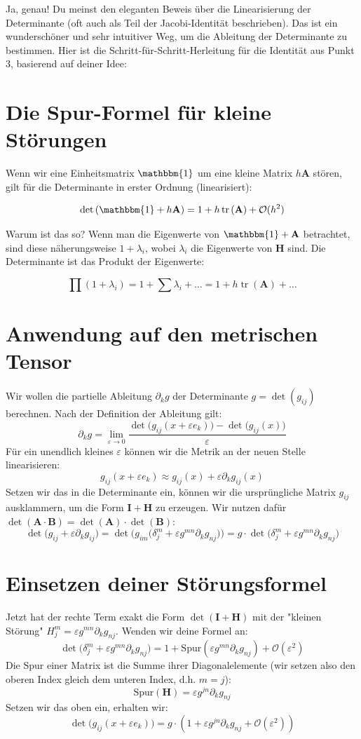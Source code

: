 \documentclass{article}
\newcommand{\p}[1]{\left(#1\right)}
\newcommand{\tr}{\operatorname{tr}}
\begin{document}
Ja, genau! Du meinst den eleganten Beweis über die Linearisierung der Determinante (oft auch als Teil der Jacobi-Identität beschrieben). Das ist ein wunderschöner und sehr intuitiver Weg, um die Ableitung der Determinante zu bestimmen.
Hier ist die Schritt-für-Schritt-Herleitung für die Identität aus Punkt 3, basierend auf deiner Idee:

 \section{Die Spur-Formel für kleine Störungen}
Wenn wir eine Einheitsmatrix $\mathbbm{1}$ um eine kleine Matrix $ h \mathbf{A}$ stören, gilt für die Determinante in erster Ordnung (linearisiert):


$$\det \p{\mathbbm{1} + h \mathbf{A}} = 1 + h \tr\p{\mathbf{A}} + \mathcal{O}(h^2)$$ 

Warum ist das so? Wenn man die Eigenwerte von $\mathbbm{1} + \mathbf{A}$ betrachtet, sind diese näherungsweise $1 + λ_i$, wobei $λ_i$ die Eigenwerte von $\mathbf{H}$ sind. Die Determinante ist das Produkt der Eigenwerte:

$$\prod (1 + λ_i) = 1 + \sum λ_i + \dots = 1 + h \tr \p{\mathbf{A}} + \dots$$

\section{Anwendung auf den metrischen Tensor}
Wir wollen die partielle Ableitung $\partial_k g$ der Determinante $g = \det(g_{ij})$ berechnen. Nach der Definition der Ableitung gilt:
$$\partial_k g = \lim_{ε \to 0} \frac{\det\big(g_{ij}(x + ε e_k)\big) - \det\big(g_{ij}(x)\big)}{ε}$$ 
Für ein unendlich kleines $ε$ können wir die Metrik an der neuen Stelle linearisieren:
$$g_{ij}(x + ε e_k) \approx g_{ij}(x) + ε \partial_k g_{ij}(x)$$ 
Setzen wir das in die Determinante ein, können wir die ursprüngliche Matrix $g_{ij}$ ausklammern, um die Form $\mathbf{I} + \mathbf{H}$ zu erzeugen. Wir nutzen dafür $\det(\mathbf{A}·\mathbf{B}) = \det(\mathbf{A})·\det(\mathbf{B})$:
$$\det\big(g_{ij} + ε \partial_k g_{ij}\big) = \det\Big( g_{im} \big( \delta^m_j + ε g^{mn} \partial_k g_{nj} \big) \Big) = g · \det\big(\delta^m_j + ε g^{mn} \partial_k g_{nj}\big)$$ 

\section{Einsetzen deiner Störungsformel}
Jetzt hat der rechte Term exakt die Form $\det\p{\mathbf{I} + \mathbf{H}}$ mit der "kleinen Störung" $H^m_j = ε g^{mn} \partial_k g_{nj}$.
Wenden wir deine Formel an:
$$\det\big(\delta^m_j + ε g^{mn} \partial_k g_{nj}\big) = 1 + \text{Spur}(ε g^{mn} \partial_k g_{nj}) + \mathcal{O}(ε^2)$$ 
Die Spur einer Matrix ist die Summe ihrer Diagonalelemente (wir setzen also den oberen Index gleich dem unteren Index, d.h. $m = j$):
$$\text{Spur}(\mathbf{H}) = ε g^{jn} \partial_k g_{nj}$$ 
Setzen wir das oben ein, erhalten wir:
$$\det\big(g_{ij}(x + ε e_k)\big) = g · \p{ 1 + ε g^{jn} \partial_k g_{nj} + \mathcal{O}(ε^2) }$$ 
\end{document}
